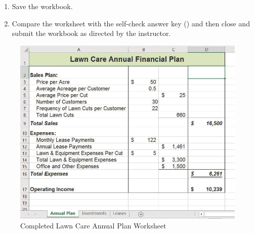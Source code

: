 \begin{enumerate}
	\begin{enumerate}
		\item On the  sheet, apply Accounting format with $ 0 $ decimals to ,  , and . Apply Comma format with $ 0 $ decimals to the ranges  and . 

		\item On the  worksheet, apply Accounting format with two decimals to the range  and . Apply Comma format with two decimals to the range . 
	\end{enumerate}
	
	Double check that the formatting matches Figures \ref{02:fig47}, \ref{02:fig48}, and \ref{02:fig49}.
	\item Save the  workbook.
	\item Compare the worksheet with the self-check answer key () and then close and submit the  workbook as directed by the instructor.

\end{enumerate}

\begin{figure}[H]
	\centering
	\includegraphics[width=\maxwidth{.95\linewidth}]{gfx/ch02_fig47}
	\caption{Completed Lawn Care Annual Plan Worksheet}
	\label{02:fig47}
\end{figure}

